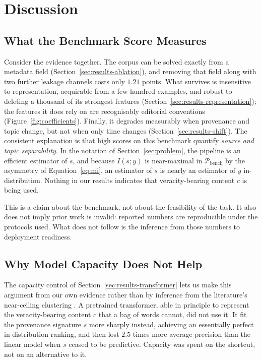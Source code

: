 \documentclass[conference]{IEEEtran}
\begin{document}
\section{Discussion}
\label{sec:discussion}

\subsection{What the Benchmark Score Measures}
Consider the evidence together. The corpus can be solved exactly from a
metadata field (Section~\ref{sec:results-ablation}), and removing that field
along with two further leakage channels costs only $1.21$ points. What survives
is insensitive to representation, acquirable from a few hundred examples, and
robust to deleting a thousand of its strongest features
(Section~\ref{sec:results-representation}); the features it does rely on are
recognisably editorial conventions (Figure~\ref{fig:coefficients}). Finally, it
degrades measurably when provenance and topic change, but not when only time
changes (Section~\ref{sec:results-shift}). The consistent explanation is that
high scores on this benchmark quantify \emph{source and topic separability}. In
the notation of Section~\ref{sec:problem}, the pipeline is an efficient
estimator of $s$, and because $I(s;y)$ is near-maximal in
$\mathcal{P}_{\text{bench}}$ by the asymmetry of Equation~\eqref{eq:mi}, an
estimator of $s$ is nearly an estimator of $y$ in-distribution. Nothing in our results indicates that veracity-bearing content
$c$ is being used.

This is a claim about the benchmark, not about the feasibility of the task. It
also does not imply prior work is invalid: reported numbers are reproducible
under the protocols used. What does not follow is the inference from those
numbers to deployment readiness.

\subsection{Why Model Capacity Does Not Help}
The capacity control of Section~\ref{sec:results-transformer} lets us make this
argument from our own evidence rather than by inference from the literature's
near-ceiling clustering \cite{khan2021benchmark,kaliyar2021fakebert}. A
pretrained transformer, able in principle to represent the veracity-bearing
content $c$ that a bag of words cannot, did not use it. It fit the provenance
signature $s$ more sharply instead, achieving an essentially perfect
in-distribution ranking, and then lost $2.5$ times more average precision than
the linear model when $s$ ceased to be predictive. Capacity was spent on the
shortcut, not on an alternative to it.
\end{document}
